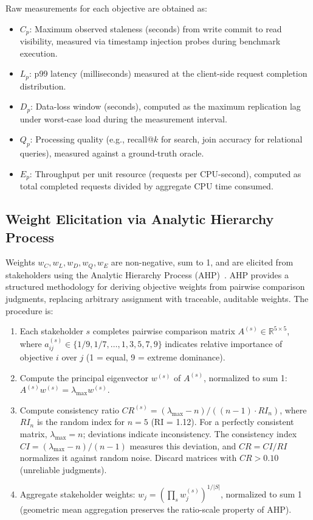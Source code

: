 \documentclass[conference]{IEEEtran}
\begin{document}
Raw measurements for each objective are obtained as:
\begin{itemize}
    \item $C_p$: Maximum observed staleness (seconds) from write commit to read visibility, measured via timestamp injection probes during benchmark execution.
    \item $L_p$: p99 latency (milliseconds) measured at the client-side request completion distribution.
    \item $D_p$: Data-loss window (seconds), computed as the maximum replication lag under worst-case load during the measurement interval.
    \item $Q_p$: Processing quality (e.g., recall@$k$ for search, join accuracy for relational queries), measured against a ground-truth oracle.
    \item $E_p$: Throughput per unit resource (requests per CPU-second), computed as total completed requests divided by aggregate CPU time consumed.
\end{itemize}

\subsection{Weight Elicitation via Analytic Hierarchy Process}
\label{sec:ahp}

Weights $w_C, w_L, w_D, w_Q, w_E$ are non-negative, sum to 1, and are elicited from stakeholders using the Analytic Hierarchy Process (AHP)~\cite{saaty2008decision}. AHP provides a structured methodology for deriving objective weights from pairwise comparison judgments, replacing arbitrary assignment with traceable, auditable weights. The procedure is:

\begin{enumerate}
    \item Each stakeholder $s$ completes pairwise comparison matrix $A^{(s)} \in \mathbb{R}^{5 \times 5}$, where $a_{ij}^{(s)} \in \{1/9, 1/7, \ldots, 1, 3, 5, 7, 9\}$ indicates relative importance of objective $i$ over $j$ (1 = equal, 9 = extreme dominance).
    \item Compute the principal eigenvector $w^{(s)}$ of $A^{(s)}$, normalized to sum 1: $A^{(s)} w^{(s)} = \lambda_{\text{max}} w^{(s)}$.
    \item Compute consistency ratio $CR^{(s)} = (\lambda_{\text{max}} - n)/((n-1) \cdot RI_n)$, where $RI_n$ is the random index for $n=5$ (RI = 1.12). For a perfectly consistent matrix, $\lambda_{\text{max}} = n$; deviations indicate inconsistency. The consistency index $CI = (\lambda_{\text{max}} - n)/(n-1)$ measures this deviation, and $CR = CI/RI$ normalizes it against random noise. Discard matrices with $CR > 0.10$ (unreliable judgments).
    \item Aggregate stakeholder weights: $w_j = (\prod_s w_j^{(s)})^{1/|S|}$, normalized to sum 1 (geometric mean aggregation preserves the ratio-scale property of AHP).
\end{enumerate}
\end{document}
